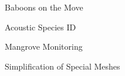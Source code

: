 \item Baboons on the Move
\item Acoustic Species ID
\item Mangrove Monitoring
\item Simplification of Special Meshes
